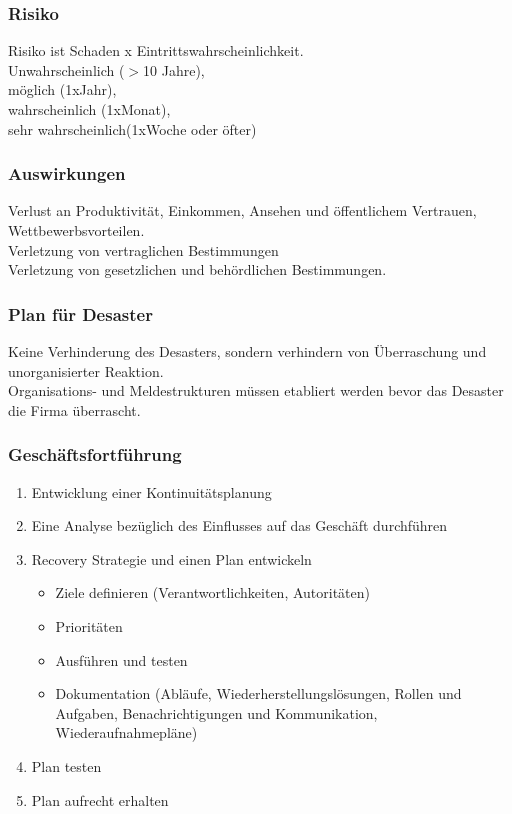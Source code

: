 \documentclass{article} %
\begin{document}
\subsubsection{Risiko}
Risiko ist Schaden x Eintrittswahrscheinlichkeit.\\

\noindent Unwahrscheinlich ($>$10 Jahre), \\
möglich (1xJahr), \\
wahrscheinlich (1xMonat),\\
sehr wahrscheinlich(1xWoche oder öfter)


\subsubsection{Auswirkungen}
Verlust an Produktivität, Einkommen, Ansehen und öffentlichem Vertrauen, Wettbewerbsvorteilen.\\
Verletzung von vertraglichen Bestimmungen\\
Verletzung von gesetzlichen und behördlichen Bestimmungen.
\subsubsection{Plan für Desaster}
Keine Verhinderung des Desasters, sondern verhindern von Überraschung und unorganisierter Reaktion.\\
Organisations- und Meldestrukturen müssen etabliert werden bevor das Desaster die Firma überrascht.
\subsubsection{Geschäftsfortführung}
	\begin{enumerate}
	\item Entwicklung einer Kontinuitätsplanung
	\item Eine Analyse bezüglich des Einflusses auf das Geschäft durchführen
	\item Recovery Strategie und einen Plan entwickeln
		\begin{itemize}
		\item Ziele definieren (Verantwortlichkeiten, Autoritäten)
		\item Prioritäten
		\item Ausführen und testen
		\item Dokumentation (Abläufe, Wiederherstellungslösungen, Rollen und Aufgaben, Benachrichtigungen und Kommunikation, Wiederaufnahmepläne)
		\end{itemize}
	\item Plan testen
	\item Plan aufrecht erhalten
	\end{enumerate}
\end{document}
